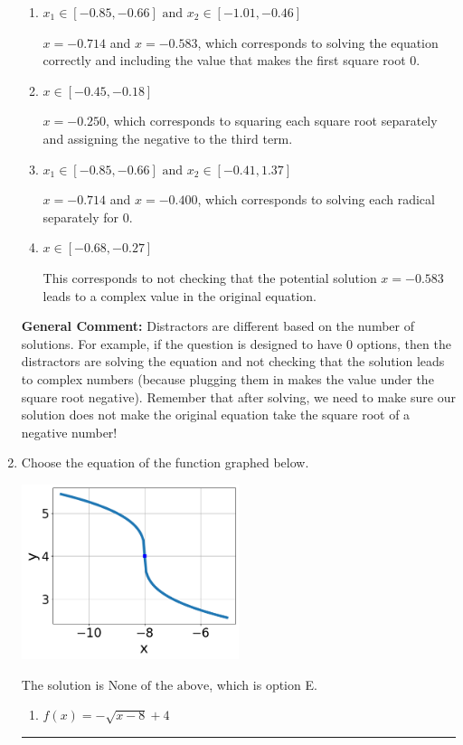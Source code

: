 \documentclass{extbook}[14pt]
\newcommand{\litem}[1]{\item #1

\rule{\textwidth}{0.4pt}}
\begin{document}
\begin{enumerate}
{\begin{enumerate}[label=\Alph*.]
*$x = -0.583$ leads to a complex value in the equation, so this is the correct option.
\item \( x_1 \in [-0.85, -0.66] \text{ and } x_2 \in [-1.01,-0.46] \)

$x = -0.714$ and $x = -0.583$, which corresponds to solving the equation correctly and including the value that makes the first square root 0.
\item \( x \in [-0.45,-0.18] \)

$x = -0.250$, which corresponds to squaring each square root separately and assigning the negative to the third term.
\item \( x_1 \in [-0.85, -0.66] \text{ and } x_2 \in [-0.41,1.37] \)

$x = -0.714$ and $x = -0.400$, which corresponds to solving each radical separately for 0.
\item \( x \in [-0.68,-0.27] \)

This corresponds to not checking that the potential solution $x = -0.583$ leads to a complex value in the original equation.
\end{enumerate}

\textbf{General Comment:} Distractors are different based on the number of solutions. For example, if the question is designed to have 0 options, then the distractors are solving the equation and not checking that the solution leads to complex numbers (because plugging them in makes the value under the square root negative). Remember that after solving, we need to make sure our solution does not make the original equation take the square root of a negative number!
}
\litem{
Choose the equation of the function graphed below.

\begin{center}
    \includegraphics[width=0.5\textwidth]{../Figures/radicalGraphToEquationA.png}
\end{center}



The solution is \( \text{None of the above} \), which is option E.\begin{enumerate}[label=\Alph*.]
\item \( f(x) = - \sqrt{x - 8} + 4 \)


\end{enumerate}}
\end{enumerate}
\end{document}
